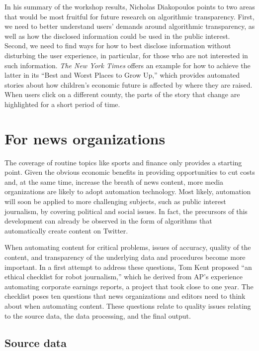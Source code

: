 \documentclass[notoc, symmetric, nobib, nols]{towcenter-guideto-book}
\begin{document}
In his summary of the workshop results, Nicholas Diakopoulos points to two areas that would be most fruitful for future research on algorithmic transparency.\autocite{diak15} First, we need to better understand users' demands around algorithmic transparency, as well as how the disclosed information could be used in the public interest. Second, we need to find ways for how to best disclose information without disturbing the user experience, in particular, for those who are not interested in such information. \textit{The New York Times} offers an example for how to achieve the latter in its ``Best and Worst Places to Grow Up,'' which provides automated stories about how children's economic future is affected by where they are raised.\autocite{leon15} When users click on a different county, the parts of the story that change are highlighted for a short period of time.

\section{For news organizations}

The coverage of routine topics like sports and finance only provides a starting point. Given the obvious economic benefits in providing opportunities to cut costs and, at the same time, increase the breath of news content, more media organizations are likely to adopt automation technology. Most likely, automation will soon be applied to more challenging subjects, such as public interest journalism, by covering political and social issues. In fact, the precursors of this development can already be observed in the form of algorithms that automatically create content on Twitter.\autocite{lokot15} 

When automating content for critical problems, issues of accuracy, quality of the content, and transparency of the underlying data and procedures become more important. In a first attempt to address these questions, Tom Kent proposed ``an ethical checklist for robot journalism,'' which he derived from AP's experience automating corporate earnings reports, a project that took close to one year. The checklist poses ten questions that news organizations and editors need to think about when automating content.\autocite{kent15} These questions relate to quality issues relating to the source data, the data processing, and the final output.

\subsection{Source data}
\end{document}
